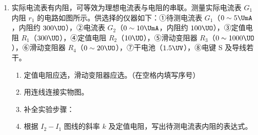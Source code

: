 \documentclass[\gkver]{gaokaozhenti}
\begin{document}
\begin{enumerate}
\item
实际电流表有内阻，可等效为理想电流表与电阻的串联。测量实际电流表 $G_{1}$ 内阻 $r_{1}$ 的电路如图所示。供选择的仪器如下：①待测电流表 $G_{1}$（$0 \sim 5\UmA$，内阻约 $300\UO$），②电流表 $G_{2}$（$0 \sim 10\UmA$，内阻约 $100\UO$），③定值电阻 $R_{1}$（$300\UO$），④定值电阻 $R_{2}$（$10\UO$），⑤滑动变阻器 $R_{3}$（$0 \sim 1000\UO$），⑥滑动变阻器 $R_{4}$（$0 \sim 20\UO$），⑦干电池（$1.5\UV$），⑧电键 S 及导线若干。
\onepicture[align=right, h=2.56cm]{}
\begin{enumerate}
	\item
	定值电阻应选，滑动变阻器应选。（在空格内填写序号）
	\item
	用连线连接实物图。
	\drawpicanswer{\onepicture[h=4.60cm]{}}{\onepicture[h=4.60cm]{}}
	\item
	补全实验步骤：
	\item
	根据 $I_{2} - I_{1}$ 图线的斜率 $k$ 及定值电阻，写出待测电流表内阻的表达式。
\end{enumerate}
\end{enumerate}
\end{document}
